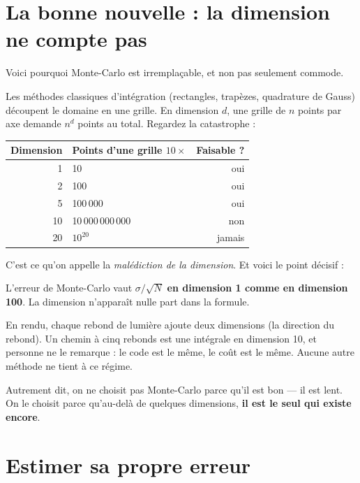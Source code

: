 \section{La bonne nouvelle : la dimension ne compte pas}

Voici pourquoi Monte-Carlo est irremplaçable, et non pas seulement commode.

Les méthodes classiques d'intégration (rectangles, trapèzes, quadrature de
Gauss) découpent le domaine en une grille. En dimension $d$, une grille de $n$
points par axe demande $n^d$ points au total. Regardez la catastrophe :

\begin{center}
\begin{tabular}{@{}rlr@{}}
\toprule
\textbf{Dimension} & \textbf{Points d'une grille $10\times$} & \textbf{Faisable ?} \\
\midrule
1  & 10                  & oui \\
2  & 100                 & oui \\
5  & 100\,000            & oui \\
10 & 10\,000\,000\,000   & non \\
20 & $10^{20}$           & jamais \\
\bottomrule
\end{tabular}
\end{center}

C'est ce qu'on appelle la \emph{malédiction de la dimension}. Et voici le point
décisif :

\begin{nkretenir}
L'erreur de Monte-Carlo vaut $\sigma/\sqrt{N}$ \textbf{en dimension 1 comme en
dimension 100}. La dimension n'apparaît nulle part dans la formule.

En rendu, chaque rebond de lumière ajoute deux dimensions (la direction du
rebond). Un chemin à cinq rebonds est une intégrale en dimension 10, et
personne ne le remarque : le code est le même, le coût est le même. Aucune
autre méthode ne tient à ce régime.
\end{nkretenir}

Autrement dit, on ne choisit pas Monte-Carlo parce qu'il est bon — il est lent.
On le choisit parce qu'au-delà de quelques dimensions, \textbf{il est le seul
qui existe encore}.

\section{Estimer sa propre erreur}

